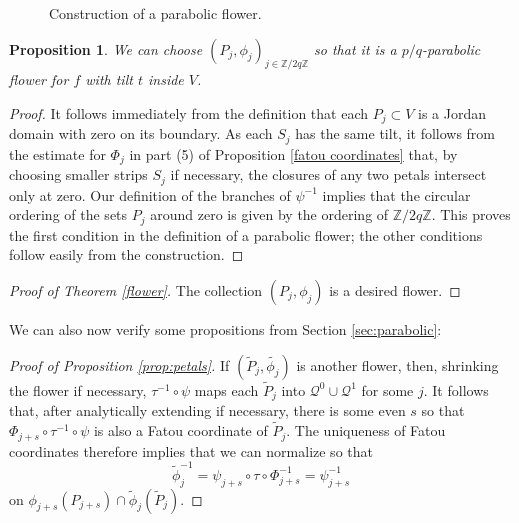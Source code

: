 \documentclass[12pt,letterpaper]{amsart}
\numberwithin{equation}{section}
\newtheorem{prop}[equation]{Proposition}
\theoremstyle{remark}
\theoremstyle{definition}
\newcommand{\Z}{\mathbb Z}
\newcommand{\QQ}{\mathcal Q}
\begin{document}
		\begin{figure}
		\begin{center}
			\def\svgwidth{4in}
			
			\caption{Construction of a parabolic flower.}
			\label{fig flower parabolic}
		\end{center}
	\end{figure}
	
	
	\begin{prop}
		We can choose $(P_j, \phi_j)_{j\in \Z/2q\Z}$ so that it is a $p/q$-parabolic flower for $f$ with tilt $t$ inside $V$.
	\end{prop}
	
	\begin{proof}
		It follows immediately from the definition that each $P_j\subset V$ is a Jordan domain with zero on its boundary.
		As each $S_j$ has the same tilt, it follows from the estimate for  $\Phi_j$ in part (5) of Proposition \ref{fatou coordinates} that, by choosing smaller strips $S_j$ if necessary, the closures of any two petals intersect only at zero. 
		Our definition of the branches of $\psi^{-1}$ implies that the circular ordering of the sets $P_j$ around zero is given by the ordering of $\Z/2q\Z$. 
		This proves the first condition in the definition of a parabolic flower; the other conditions follow easily from the construction.
	\end{proof}
	
	\begin{proof}[Proof of Theorem \ref{flower}]
		The collection $(P_j, \phi_j)$ is a desired flower.
	\end{proof}
	
	
	We can also now verify some propositions from Section \ref{sec:parabolic}:
	
	
	\begin{proof}[Proof of Proposition \ref{prop:petals}]
		If $(\tilde{P}_j, \tilde{\phi_j})$ is another flower, then, shrinking the flower if necessary, $\tau^{-1}\circ \psi$ maps each $\tilde{P}_j$ into $\QQ^{0}\cup \QQ^{1}$ for some $j$. It follows that, after analytically extending if necessary, there is some even $s$ so that $\Phi_{j+s}\circ \tau^{-1}\circ \psi$ is also a Fatou coordinate of $\tilde{P}_j$. The uniqueness of Fatou coordinates therefore implies that we can normalize so that
		$$\tilde{\phi}_j^{-1}= \psi_{j+s}\circ \tau\circ \Phi_{j+s}^{-1} = \psi_{j+s}^{-1}$$
		 on $\phi_{j+s}(P_{j+s})\cap \tilde \phi_j(\tilde P_j).$
	\end{proof}
	
\end{document}
